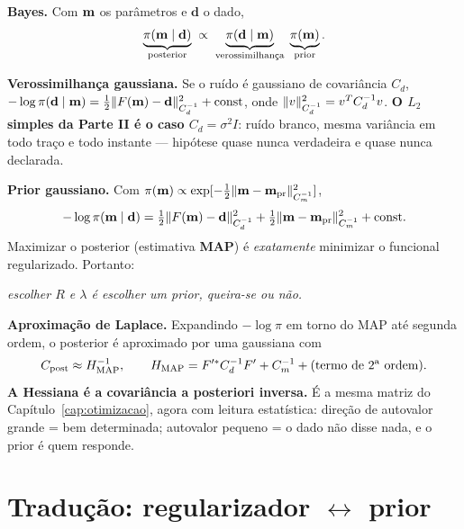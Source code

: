 \documentclass[11pt,a4paper,oneside]{report}
\begin{document}
\begin{matematica}
\textbf{Bayes.} Com $\mathbf{m}$ os par\^ametros e $\mathbf{d}$ o dado,
\[
\underbrace{\pi(\mvec\mid\mathbf{d})}_{\text{posterior}}
 \;\propto\;
\underbrace{\pi(\mathbf{d}\mid\mvec)}_{\text{verossimilhan\c{c}a}}\;
\underbrace{\pi(\mvec)}_{\text{prior}} .
\]

\textbf{Verossimilhan\c{c}a gaussiana.} Se o ru\'ido \'e gaussiano de
covari\^ancia $C_d$,
$-\log\pi(\mathbf{d}\mid\mathbf{m})
 = \tfrac12\lVert F(\mathbf{m})-\mathbf{d} \rVert^{2}_{C_d^{-1}} + \text{const}$,
onde $\lVert v \rVert^{2}_{C_d^{-1}} = v^{T}C_d^{-1}v$. \textbf{O $L_2$ simples da
Parte II \'e o caso $C_d = \sigma^{2}I$}: ru\'ido branco, mesma
vari\^ancia em todo tra\c{c}o e todo instante --- hip\'otese quase nunca
verdadeira e quase nunca declarada.

\textbf{Prior gaussiano.} Com $\pi(\mathbf{m}) \propto
\exp[-\tfrac12\lVert \mathbf{m}-\mathbf{m}_{\text{pr}} \rVert^{2}_{C_m^{-1}}]$,
\[
-\log\pi(\mathbf{m}\mid\mathbf{d})
 = \tfrac12\lVert F(\mathbf{m})-\mathbf{d} \rVert^{2}_{C_d^{-1}}
 + \tfrac12\lVert \mathbf{m}-\mathbf{m}_{\text{pr}} \rVert^{2}_{C_m^{-1}} + \text{const}.
\]
Maximizar o posterior (estimativa \textbf{MAP}) \'e \emph{exatamente}
minimizar o funcional regularizado. Portanto:
\begin{center}
\emph{escolher $R$ e $\lambda$ \'e escolher um prior, queira-se ou n\~ao.}
\end{center}

\textbf{Aproxima\c{c}\~ao de Laplace.} Expandindo $-\log\pi$ em torno do MAP
at\'e segunda ordem, o posterior \'e aproximado por uma gaussiana com
\[
C_{\text{post}} \approx H_{\text{MAP}}^{-1},
\qquad
H_{\text{MAP}} = F'^{*}C_d^{-1}F' + C_m^{-1} + (\text{termo de 2\textsuperscript{a} ordem}).
\]
\textbf{A Hessiana \'e a covari\^ancia a posteriori inversa.} \'E a mesma
matriz do Cap\'itulo~\ref{cap:otimizacao}, agora com leitura estat\'istica:
dire\c{c}\~ao de autovalor grande = bem determinada; autovalor pequeno = o
dado n\~ao disse nada, e o prior \'e quem responde.
\end{matematica}

\section{Tradu\c{c}\~ao: regularizador $\leftrightarrow$ prior}
\end{document}
